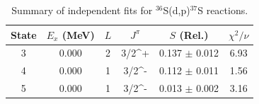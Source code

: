 \begin{table}[h]
\centering
\caption{Summary of independent fits for ${}^{36}$S(d,p)${}^{37}$S reactions.}
\begin{tabular}{c c c c c c}
\hline\hline
State & $E_x$ (MeV) & $L$ & $J^\pi$ & $S$ (Rel.) & $\chi^2/\nu$ \\
\hline
3 & 0.000 & 2 & 3/2^{+} & 0.137 $\pm$ 0.012 & 6.93 \\
4 & 0.000 & 1 & 3/2^{-} & 0.112 $\pm$ 0.011 & 1.56 \\
5 & 0.000 & 1 & 3/2^{-} & 0.013 $\pm$ 0.002 & 3.16 \\
\hline\hline
\end{tabular}
\label{tab:sf_results}
\end{table}
